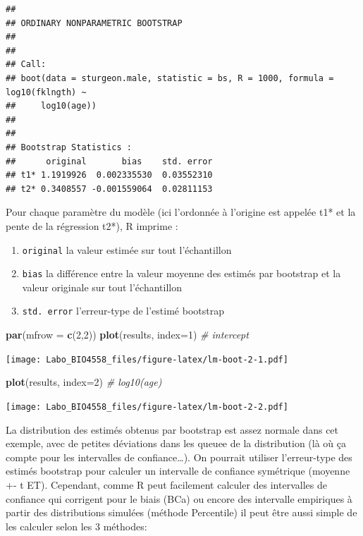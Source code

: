 \documentclass[12pt,]{book}
\newenvironment{Shaded}{\begin{snugshade}}{\end{snugshade}}
\newcommand{\CommentTok}[1]{\textcolor[rgb]{0.56,0.35,0.01}{\textit{#1}}}
\newcommand{\DataTypeTok}[1]{\textcolor[rgb]{0.13,0.29,0.53}{#1}}
\newcommand{\DecValTok}[1]{\textcolor[rgb]{0.00,0.00,0.81}{#1}}
\newcommand{\KeywordTok}[1]{\textcolor[rgb]{0.13,0.29,0.53}{\textbf{#1}}}
\newcommand{\NormalTok}[1]{#1}
\providecommand{\tightlist}{%
  \setlength{\itemsep}{0pt}\setlength{\parskip}{0pt}}
\begin{document}
\begin{verbatim}
## 
## ORDINARY NONPARAMETRIC BOOTSTRAP
## 
## 
## Call:
## boot(data = sturgeon.male, statistic = bs, R = 1000, formula = log10(fklngth) ~ 
##     log10(age))
## 
## 
## Bootstrap Statistics :
##      original       bias    std. error
## t1* 1.1919926  0.002335530  0.03552310
## t2* 0.3408557 -0.001559064  0.02811153
\end{verbatim}

Pour chaque paramètre du modèle (ici l'ordonnée à l'origine est
appelée t1* et la pente de la régression t2*), R imprime :

\begin{enumerate}
\def\labelenumi{\arabic{enumi}.}
\tightlist
\item
  \texttt{original} la valeur estimée sur tout l'échantillon
\item
  \texttt{bias} la différence entre la valeur moyenne des estimés par bootstrap et la valeur originale sur tout l'échantillon
\item
  \texttt{std.\ error} l'erreur-type de l'estimé bootstrap
\end{enumerate}

\begin{Shaded}
\begin{Highlighting}[]
\KeywordTok{par}\NormalTok{(}\DataTypeTok{mfrow =} \KeywordTok{c}\NormalTok{(}\DecValTok{2}\NormalTok{,}\DecValTok{2}\NormalTok{))}
\KeywordTok{plot}\NormalTok{(results, }\DataTypeTok{index=}\DecValTok{1}\NormalTok{) }\CommentTok{# intercept}
\end{Highlighting}
\end{Shaded}

\texttt{[image: Labo\_BIO4558\_files/figure-latex/lm-boot-2-1.pdf]}

\begin{Shaded}
\begin{Highlighting}[]
\KeywordTok{plot}\NormalTok{(results, }\DataTypeTok{index=}\DecValTok{2}\NormalTok{) }\CommentTok{# log10(age)}
\end{Highlighting}
\end{Shaded}

\texttt{[image: Labo\_BIO4558\_files/figure-latex/lm-boot-2-2.pdf]}

La distribution des estimés obtenus par bootstrap est assez normale dans cet exemple, avec de petites déviations dans les queuee de la distribution (là où ça compte pour les intervalles de confiance\ldots{}). On pourrait utiliser l'erreur-type des estimés bootstrap pour calculer un intervalle de confiance symétrique (moyenne +- t ET). Cependant, comme R peut facilement calculer des intervalles de confiance qui corrigent pour le biais (BCa) ou encore des intervalle empiriques à partir des distributions simulées (méthode Percentile) il peut être aussi simple de les calculer selon les 3 méthodes:
\end{document}
